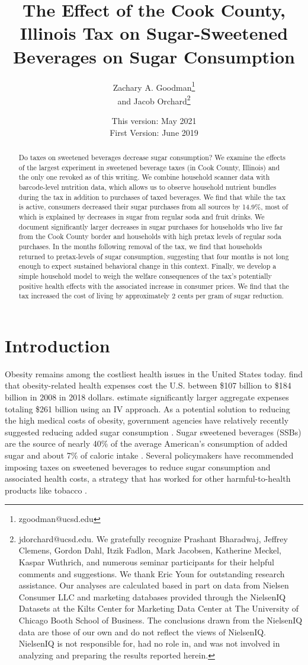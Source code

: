 \documentclass[12pt]{article}
\title{The Effect of the Cook County, Illinois Tax on Sugar-Sweetened Beverages on Sugar Consumption}
\author{Zachary A. Goodman\thanks{zgoodman@ucsd.edu}\\ and Jacob Orchard\thanks{jdorchard@ucsd.edu. We gratefully recognize Prashant Bharadwaj, Jeffrey Clemens, Gordon Dahl, Itzik Fadlon, Mark Jacobsen, Katherine Meckel, Kaspar Wuthrich, and numerous seminar participants for their helpful comments and suggestions. We thank Eric Youn for outstanding research assistance. Our analyses are calculated based in part on data from Nielsen Consumer LLC and marketing databases provided through the NielsenIQ Datasets at the Kilts Center for Marketing Data Center at The University of Chicago Booth School of Business. The conclusions drawn from the NielsenIQ data are those of our own and do not reflect the views of NielsenIQ. NielsenIQ is not responsible for, had no role in, and was not involved in analyzing and preparing the results reported herein.}}
\affil{University of California, San Diego}
\date{This version: May 2021\\
First Version: June 2019}
\begin{document}
\maketitle

\begin{abstract}

Do taxes on sweetened beverages decrease sugar consumption? We examine the effects of the largest experiment in sweetened beverage taxes (in Cook County, Illinois) and the only one revoked as of this writing. We combine household scanner data with barcode-level nutrition data, which allows us to observe household nutrient bundles during the tax in addition to purchases of taxed beverages. We find that while the tax is active, consumers decreased their sugar purchases from all sources by 14.9\%, most of which is explained by decreases in sugar from regular soda and fruit drinks. We document significantly larger decreases in sugar purchases for households who live far from the Cook County border and households with high pretax levels of regular soda purchases. In the months following removal of the tax, we find that households returned to pretax-levels of sugar consumption, suggesting that four months is not long enough to expect sustained behavioral change in this context. Finally, we develop a simple household model to weigh the welfare consequences of the tax's potentially positive health effects with the associated increase in consumer prices. We find that the tax increased the cost of living by approximately 2 cents per gram of sugar reduction.
\end{abstract}

\pagebreak

\doublespacing

\section{Introduction} \label{introduction}

Obesity remains among the costliest health issues in the United States today. \textcite{finkelstein2009annual} find that obesity-related health expenses cost the U.S. between \$107 billion to \$184 billion in 2008 in 2018 dollars. \textcite{cawley2012medical} estimate significantly larger aggregate expenses totaling \$261 billion using an IV approach. As a potential solution to reducing the high medical costs of obesity, government agencies have relatively recently suggested reducing added sugar consumption \parencite{dietary2015dietary}. Sugar sweetened beverages (SSBs) are the source of nearly 40\% of the average American's consumption of added sugar \parencite{dietary2015dietary} and about 7\% of caloric intake \parencite{allcott2019should}. Several policymakers have recommended imposing taxes on sweetened beverages to reduce sugar consumption and associated health costs, a strategy that has worked for other harmful-to-health products like tobacco \parencite{chaloupka2012tobacco}.
\end{document}
